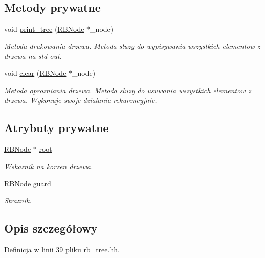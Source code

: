 \subsection*{Metody prywatne}
\begin{DoxyCompactItemize}
\item 
void \hyperlink{class_r_b_tree_aaae99736aba689ed1bf78fae6cdc2136}{print\-\_\-tree} (\hyperlink{struct_r_b_node}{R\-B\-Node} $\ast$\-\_\-node)
\begin{DoxyCompactList}\small\item\em Metoda drukowania drzewa. Metoda sluzy do wypisywania wszystkich elementow z drzewa na std out. \end{DoxyCompactList}\item 
void \hyperlink{class_r_b_tree_ade98f364326386c42f0da62b9ab5f950}{clear} (\hyperlink{struct_r_b_node}{R\-B\-Node} $\ast$\-\_\-node)
\begin{DoxyCompactList}\small\item\em Metoda oprozniania drzewa. Metoda sluzy do usuwania wszystkich elementow z drzewa. Wykonuje swoje dzialanie rekurencyjnie. \end{DoxyCompactList}\end{DoxyCompactItemize}
\subsection*{Atrybuty prywatne}
\begin{DoxyCompactItemize}
\item 
\hyperlink{struct_r_b_node}{R\-B\-Node} $\ast$ \hyperlink{class_r_b_tree_a259103b092340c5b64aabff1d9bc644c}{root}
\begin{DoxyCompactList}\small\item\em Wskaznik na korzen drzewa. \end{DoxyCompactList}\item 
\hyperlink{struct_r_b_node}{R\-B\-Node} \hyperlink{class_r_b_tree_a5c9e9868374d3854a54184d5d669d3d9}{guard}
\begin{DoxyCompactList}\small\item\em Straznik. \end{DoxyCompactList}\end{DoxyCompactItemize}


\subsection{Opis szczegółowy}


Definicja w linii 39 pliku rb\-\_\-tree.\-hh.



